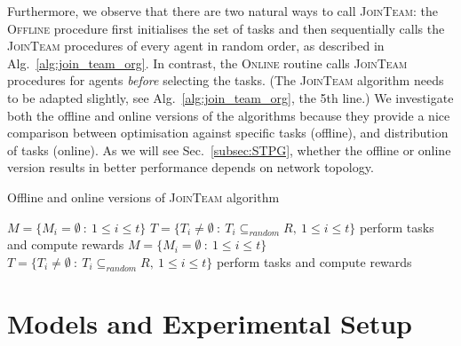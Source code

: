 \documentclass{llncs}
\begin{document}
Furthermore, we observe that there are two natural ways to call \textsc{JoinTeam}: the \textsc{Offline} procedure first initialises the set of tasks and then sequentially calls the \textsc{JoinTeam} procedures of every agent in random order, as described in Alg.~\ref{alg:join_team_org}. In contrast, the \textsc{Online} routine calls \textsc{JoinTeam} procedures for agents \emph{before} selecting the tasks. (The \textsc{JoinTeam} algorithm needs to be adapted slightly, see Alg.~\ref{alg:join_team_org}, the 5th line.)  We investigate both the offline and online versions of the algorithms because they provide a nice comparison between optimisation against specific tasks (offline), and distribution of tasks (online). As we will see Sec.~\ref{subsec:STPG}, whether the offline or online version results in better performance depends on network topology.
\vspace{-6mm}

\begin{algorithm}[H]
\caption{Offline and online versions of \textsc{JoinTeam} algorithm}
\label{alg:main_process}
\begin{scriptsize}
\begin{algorithmic} 
 
  \State $M = \{M_i = \emptyset\ :\ 1\leq i \leq t\}$ 
  \State $T = \{T_i\neq \emptyset\ :\ T_i \subseteq_{random} R,\ 1\leq i \leq t\}$ 
    \State {}
  \EndFor
  \State perform tasks and compute rewards
\EndProcedure
\Statex
{} 
  \State $M = \{M_i = \emptyset\ :\ 1\leq i \leq t\}$ 
    \State {}
  \EndFor
  \State $T = \{T_i\neq \emptyset\ :\ T_i \subseteq_{random} R,\ 1\leq i \leq t\}$ 
  \State perform tasks and compute rewards
\EndProcedure
\end{algorithmic}
\end{scriptsize}
\end{algorithm}

\vspace{-30pt}
\section{Models and Experimental Setup}
\vspace{-5pt}
\end{document}
